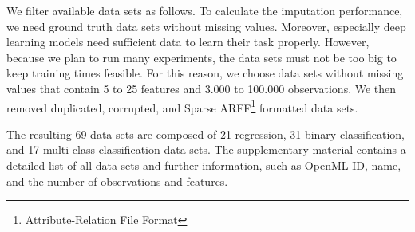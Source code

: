 \documentclass[utf8]{frontiersSCNS} %
\begin{document}
We filter available data sets as follows. To calculate the imputation performance, we need ground truth data sets without missing values. Moreover, especially deep learning models need sufficient data to learn their task properly. However, because we plan to run many experiments, the data sets must not be too big to keep training times feasible. For this reason, we choose data sets without missing values that contain 5 to 25 features and 3.000 to 100.000 observations. We then removed duplicated, corrupted, and Sparse ARFF\footnote{Attribute-Relation File Format} formatted data sets.

The resulting 69 data sets are composed of 21 regression, 31 binary classification, and 17 multi-class classification data sets. The supplementary material contains a detailed list of all data sets and further information, such as OpenML ID, name, and the number of observations and features.
\end{document}
